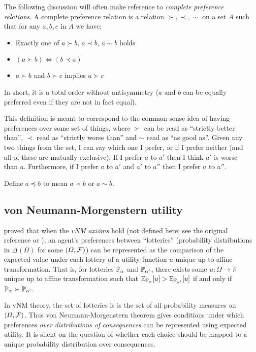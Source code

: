 The following discussion will often make reference to \emph{complete preference relations}. A complete preference relation is a relation $\succ,\prec,\sim$ on a set $A$ such that for any $a,b,c$ in $A$ we have:
\begin{itemize}
    \item Exactly one of $a\succ b$, $a\prec b$, $a\sim b$ holds
    \item $(a\succ b)\iff(b\prec a)$
    \item $a\succ b$ and $b\succ c$ implies $a\succ c$
\end{itemize}
In short, it is a total order without antisymmetry ($a$ and $b$ can be equally preferred even if they are not in fact equal).

This definition is meant to correspond to the common sense idea of having preferences over some set of things, where $\succ$ can be read as ``strictly better than'', $\prec$ read as ``strictly worse than'' and $\sim$ read as ``as good as''. Given any two things from the set, I can say which one I prefer, or if I prefer neither (and all of these are mutually exclusive). If I prefer $a$ to $a'$ then I think $a'$ is worse than $a$. Furthermore, if I prefer $a$ to $a'$ and $a'$ to $a''$ then I prefer $a$ to $a''$.

Define $a\preceq b$ to mean $a\prec b$ or $a \sim b$.

\subsection{von Neumann-Morgenstern utility}

\citet{von_neumann_theory_1944} proved that when the \emph{vNM axioms} hold (not defined here; see the original reference or \citet{steele_decision_2020}), an agent's preferences between ``lotteries'' (probability distributions in $\Delta(\Omega)$ for some $(\Omega,\mathcal{F})$) can be represented as the comparison of the expected value under each lottery of a utility function $u$ unique up to affine transformation. That is, for lotteries $\mathbb{P}_\alpha$ and $\mathbb{P}_{\alpha'}$, there exists some $u:\Omega\to \mathbb{R}$ unique up to affine transformation such that $\mathbb{E}_{\mathbb{P}_\alpha}[u]> \mathbb{E}_{\mathbb{P}_{\alpha'}}[u]$ if and only if $\mathbb{P}_{\alpha} \succ \mathbb{P}_{\alpha'}$.

In vNM theory, the set of lotteries is is the set of all probability measures on $(\Omega,\mathcal{F})$. Thus von Neumann-Morgenstern theorem gives conditions under which preferences \emph{over distributions of consequences} can be represented using expected utility. It is silent on the question of whether each choice should be mapped to a unique probability distribution over consequences.

